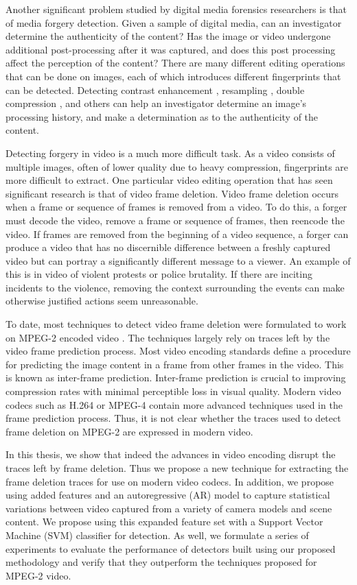 Another significant problem studied by digital media forensics researchers is that of media forgery detection. Given a sample of digital media, can an investigator determine the authenticity of the content? Has the image or video undergone additional post-processing after it was captured, and does this post processing affect the perception of the content? There are many different editing operations that can be done on images, each of which introduces different fingerprints that can be detected. Detecting contrast enhancement \cite{contrastenhance}, resampling \cite{resampling}, double compression \cite{doubleJPEG}, and others \cite{lca} can help an investigator determine an image's processing history, and make a determination as to the authenticity of the content.

Detecting forgery in video is a much more difficult task. As a video consists of multiple images, often of lower quality due to heavy compression, fingerprints are more difficult to extract. One particular video editing operation that has seen significant research is that of video frame deletion. Video frame deletion occurs when a frame or sequence of frames is removed from a video. To do this, a forger must decode the video, remove a frame or sequence of frames, then reencode the video. If frames are removed from the beginning of a video sequence, a forger can produce a video that has no discernible difference between a freshly captured video but can portray a significantly different message to a viewer. An example of this is in video of violent protests or police brutality. If there are inciting incidents to the violence, removing the context surrounding the events can make otherwise justified actions seem unreasonable.

To date, most techniques to detect video frame deletion were formulated to work on MPEG-2 encoded video\cite{wang} \cite{stamm}. The techniques largely rely on traces left by the video frame prediction process. Most video encoding standards define a procedure for predicting the image content in a frame from other frames in the video. This is known as inter-frame prediction. Inter-frame prediction is crucial to improving compression rates with minimal perceptible loss in visual quality. Modern video codecs such as H.264 or MPEG-4 contain more advanced techniques used in the frame prediction process. Thus, it is not clear whether the traces used to detect frame deletion on MPEG-2 are expressed in modern video. 

In this thesis, we show that indeed the advances in video encoding disrupt the traces left by frame deletion. Thus we propose a new technique for extracting the frame deletion traces for use on modern video codecs. In addition, we propose using added features and an autoregressive (AR) model to capture statistical variations between video captured from a variety of camera models and scene content. We propose using this expanded feature set with a Support Vector Machine (SVM) classifier for detection. As well, we formulate a series of experiments to evaluate the performance of detectors built using our proposed methodology and verify that they outperform the techniques proposed for MPEG-2 video.


